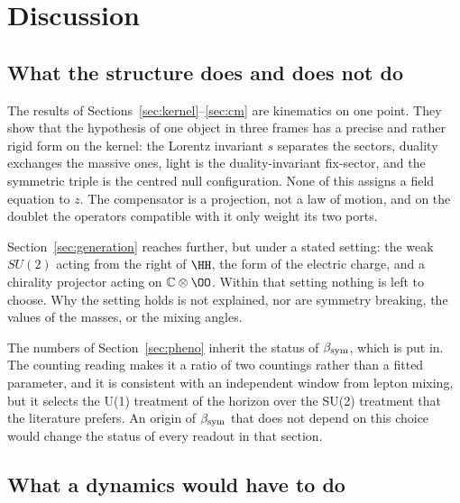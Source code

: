 \section{Discussion}\label{sec:discussion}

\subsection{What the structure does and does not do}

The results of Sections~\ref{sec:kernel}--\ref{sec:cm} are kinematics on one point.  They show that the hypothesis of one object in three
frames has a precise and rather rigid form on the kernel: the Lorentz invariant \(s\) separates the sectors, duality exchanges the massive
ones, light is the duality-invariant fix-sector, and the symmetric triple is the centred null configuration.  None of this assigns a field
equation to \(z\).  The compensator is a projection, not a law of motion, and on the doublet the operators compatible with it only weight its
two ports.

Section~\ref{sec:generation} reaches further, but under a stated setting: the weak \(SU(2)\) acting from the right of \(\HH\), the form of the
electric charge, and a chirality projector acting on \(\mathbb C\otimes\OO\).  Within that setting nothing is left to choose.  Why the setting
holds is not explained, nor are symmetry breaking, the values of the masses, or the mixing angles.

The numbers of Section~\ref{sec:pheno} inherit the status of \(\beta_{\rm sym}\), which is put in.  The counting reading makes it a ratio of two
countings rather than a fitted parameter, and it is consistent with an independent window from lepton mixing, but it selects the U(1)
treatment of the horizon over the SU(2) treatment that the literature prefers.  An origin of \(\beta_{\rm sym}\) that does not depend on this
choice would change the status of every readout in that section.

\subsection{What a dynamics would have to do}

